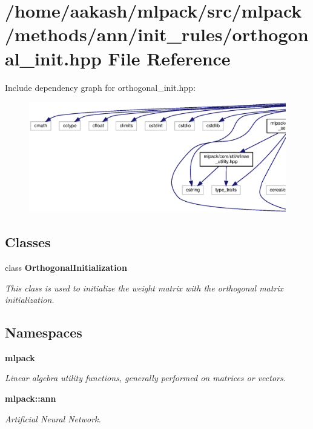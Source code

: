 \section{/home/aakash/mlpack/src/mlpack/methods/ann/init\+\_\+rules/orthogonal\+\_\+init.hpp File Reference}
\label{orthogonal__init_8hpp}
Include dependency graph for orthogonal\+\_\+init.\+hpp\+:
\nopagebreak
\begin{figure}[H]
\begin{center}
\leavevmode
\includegraphics[width=350pt]{orthogonal__init_8hpp__incl}
\end{center}
\end{figure}
\subsection*{Classes}
\begin{DoxyCompactItemize}
\item 
class \textbf{ Orthogonal\+Initialization}
\begin{DoxyCompactList}\small\item\em This class is used to initialize the weight matrix with the orthogonal matrix initialization. \end{DoxyCompactList}\end{DoxyCompactItemize}
\subsection*{Namespaces}
\begin{DoxyCompactItemize}
\item 
 \textbf{ mlpack}
\begin{DoxyCompactList}\small\item\em Linear algebra utility functions, generally performed on matrices or vectors. \end{DoxyCompactList}\item 
 \textbf{ mlpack\+::ann}
\begin{DoxyCompactList}\small\item\em Artificial Neural Network. \end{DoxyCompactList}\end{DoxyCompactItemize}



